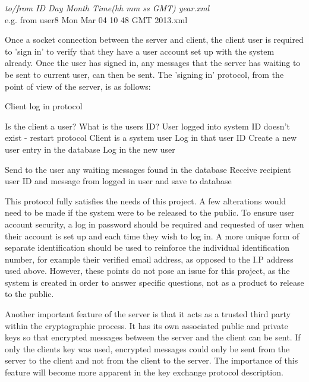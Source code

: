\documentclass[a4paper,10pt]{report}
\begin{document}
\begin{center}
 \textit{to/from ID Day Month Time(hh mm ss GMT) year.xml} \\
 e.g. from user8 Mon Mar 04 10 48 GMT 2013.xml
\end{center}

Once a socket connection between the server and client, the client user is required to 'sign in' to verify that they have a user account set up with the system already. Once the user has signed in, any messages that the server has waiting to be sent to current user, can then be sent. The 'signing in' protocol, from the point of view of the server, is as follows:

\begin{algorithm}
\caption{Client log in protocol}
\label{alg:loginprot}
\begin{algorithmic}
\State Is the client a user?
    \State What is the users ID?
      \State User logged into system
    \Else 
      \State ID doesn't exist - restart protocol
    \EndIf
\Else
      \State Client is a system user
      \State Log in that user ID
    \Else
      \State Create a new user entry in the database
      \State Log in the new user
    \EndIf
\EndIf

\State Send to the user any waiting messages found in the database
\State Receive recipient user ID and message from logged in user and save to database

\end{algorithmic}
\end{algorithm}

This protocol fully satisfies the needs of this project. A few alterations would need to be made if the system were to be released to the public. To ensure user account security, a log in password should be required and requested of user when their account is set up and each time they wish to log in. A more unique form of separate identification should be used to reinforce the individual identification number, for example their verified email address, as opposed to the I.P address used above. However, these points do not pose an issue for this project, as the system is created in order to answer specific questions, not as a product to release to the public. 

Another important feature of the server is that it acts as a trusted third party within the cryptographic process. It has its own associated public and private keys so that encrypted messages between the server and the client can be sent. If only the clients key was used, encrypted messages could only be sent from the server to the client and not from the client to the server. The importance of this feature will become more apparent in the key exchange protocol description. 
\end{document}
